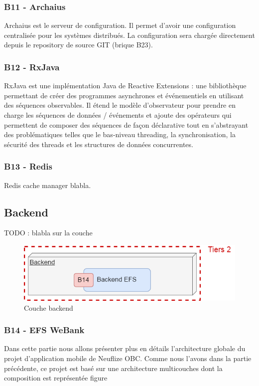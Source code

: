 	\subsubsection{B11 - Archaius}
	Archaius est le serveur de configuration. Il permet d’avoir une configuration centralisée pour les systèmes distribués. La configuration sera chargée directement depuis le repository de source GIT (brique B23).
	
	\subsubsection{B12 - RxJava}
	RxJava est une implémentation Java de Reactive Extensions : une bibliothèque permettant de créer des programmes asynchrones et événementiels en utilisant des séquences observables.
Il étend le modèle d'observateur pour prendre en charge les séquences de données / événements et ajoute des opérateurs qui permettent de composer des séquences de façon déclarative tout en s’abstrayant des problématiques telles que le bas-niveau threading, la synchronisation, la sécurité des threads et les structures de données concurrentes.
	
	\subsubsection{B13 - Redis}
	Redis cache manager blabla.

\subsection{Backend}

	TODO : blabla sur la couche
	
\begin{figure}[H]
	\includegraphics[scale=0.5]{images/travailNeuflizeOBC/architecture/coucheBackend.png}
	\centering
	\caption{Couche backend}
	\label{coucheBackend}
\end{figure}

	\subsubsection{B14 - EFS WeBank}
	Dans cette partie nous allons présenter plus en détails l'architecture globale du projet d'application mobile de Neuflize OBC. Comme nous l'avons dans la partie précédente, ce projet est basé sur une architecture multicouches dont la composition est représentée figure

